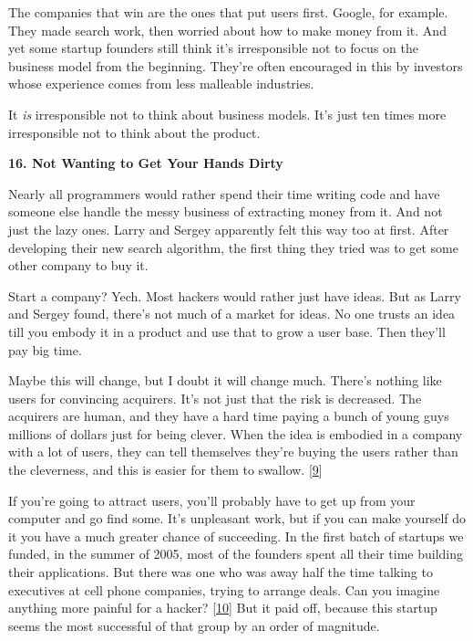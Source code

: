 The companies
                    that win are the ones that put users first. Google, for
                    example. They made search work, then worried about how to
                    make money from it. And yet some startup founders still
                    think it's irresponsible not to focus on the business model
                    from the beginning. They're often encouraged in this by
                    investors whose experience comes from less malleable
                    industries.

It \emph{is} irresponsible not to
                    think about business models. It's just ten times more
                    irresponsible not to think about the product.

\textbf{16. Not Wanting to Get Your Hands Dirty}

Nearly all programmers would rather spend their
                    time writing code and have someone else handle the messy
                    business of extracting money from it. And not just the lazy
                    ones. Larry and Sergey apparently felt this way too at
                    first. After developing their new search algorithm, the
                    first thing they tried was to get some other company to buy
                    it.

Start a company? Yech. Most hackers would
                    rather just have ideas. But as Larry and Sergey found,
                    there's not much of a market for ideas. No one trusts an
                    idea till you embody it in a product and use that to grow a
                    user base. Then they'll pay big time.

Maybe this
                    will change, but I doubt it will change much. There's
                    nothing like users for convincing acquirers. It's not just
                    that the risk is decreased. The acquirers are human, and
                    they have a hard time paying a bunch of young guys millions
                    of dollars just for being clever. When the idea is embodied
                    in a company with a lot of users, they can tell themselves
                    they're buying the users rather than the cleverness, and
                    this is easier for them to swallow.
                    [\href{\#f9n}{9}]

If you're going to attract users, you'll
                    probably have to get up from your computer and go find some.
                    It's unpleasant work, but if you can make yourself do it you
                    have a much greater chance of succeeding. In the first batch
                    of startups we funded, in the summer of 2005, most of the
                    founders spent all their time building their applications.
                    But there was one who was away half the time talking to
                    executives at cell phone companies, trying to arrange deals.
                    Can you imagine anything more painful for a hacker?
                    [\href{\#f10n}{10}]
                    But it paid off, because this startup seems the most
                    successful of that group by an order of magnitude.

